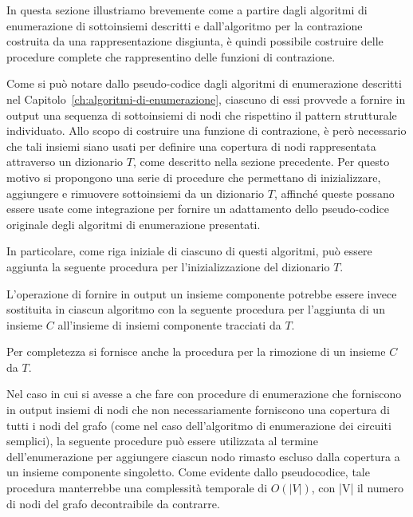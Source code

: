 In questa sezione illustriamo brevemente come a partire dagli algoritmi di enumerazione di sottoinsiemi descritti
e dall'algoritmo per la contrazione costruita da una rappresentazione disgiunta, \`e quindi possibile costruire
delle procedure complete che rappresentino delle funzioni di contrazione.

\label{subsec:procedure-per-la-gestione-deli-dizionari}

Come si pu\`o notare dallo pseudo-codice dagli algoritmi di enumerazione descritti nel
Capitolo~\ref{ch:algoritmi-di-enumerazione}, ciascuno di essi provvede a fornire in output una sequenza di
sottoinsiemi di nodi che rispettino il pattern strutturale individuato.
Allo scopo di costruire una funzione di contrazione, \`e però necessario che tali insiemi siano usati per definire
una copertura di nodi rappresentata attraverso un dizionario $T$, come descritto nella sezione precedente.
Per questo motivo si propongono una serie di procedure che permettano di inizializzare, aggiungere e rimuovere
sottoinsiemi da un dizionario $T$, affinché queste possano essere usate come integrazione per fornire un
adattamento dello pseudo-codice originale degli algoritmi di enumerazione presentati. \newline

In particolare, come riga iniziale di ciascuno di questi algoritmi, può essere aggiunta la seguente procedura per
l'inizializzazione del dizionario $T$.



L'operazione di fornire in output un insieme componente potrebbe essere invece sostituita in ciascun algoritmo
con la seguente procedura per l'aggiunta di un insieme $C$ all'insieme di insiemi componente tracciati da $T$. \newline



Per completezza si fornisce anche la procedura per la rimozione di un insieme $C$ da $T$.



Nel caso in cui si avesse a che fare con procedure di enumerazione che forniscono in output insiemi di nodi che non
necessariamente forniscono una copertura di tutti i nodi del grafo (come nel caso dell'algoritmo di enumerazione
dei circuiti semplici), la seguente procedure può essere utilizzata al termine dell'enumerazione per aggiungere
ciascun nodo rimasto escluso dalla copertura a un insieme componente singoletto. Come evidente dallo
pseudocodice, tale procedura manterrebbe una complessit\`a temporale di $O(|V|)$, con |V| il numero di nodi del grafo
decontraibile da contrarre.

